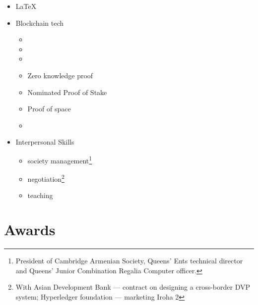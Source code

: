 \documentclass{CurriculumVitae}[10pt, condensed]
\begin{document}
\begin{multicols}{4}
\begin{itemize}[topsep=0pt]
    \item {\footnotesize \LaTeX{}}
      
    \item {\footnotesize Blockchain tech}
      \begin{itemize}[topsep=0pt, partopsep=0pt]
        \setlength{\itemsep}{-0.3em}
      \item {}
      \item {}
      \item {}
      \item Zero knowledge proof
      \item Nominated Proof of Stake
      \item Proof of space
      \item {}
      \end{itemize}
      
    \item {\footnotesize Interpersonal Skills}
      \begin{itemize}[topsep=0pt, partopsep=0pt]
        \setlength{\itemsep}{-0.3em}
      \item society management\footnote{President of Cambridge Armenian
          Society, Queens' Ents technical director and Queens' Junior
          Combination Regalia Computer officer. }
      \item negotiation\footnote{With Asian Development Bank ---
          contract on designing a cross-border DVP system; Hyperledger
          foundation ---  marketing Iroha 2}
      \item teaching
      \end{itemize}
      
    \end{itemize}

  \end{multicols}



\section*{Awards}







\end{document}
